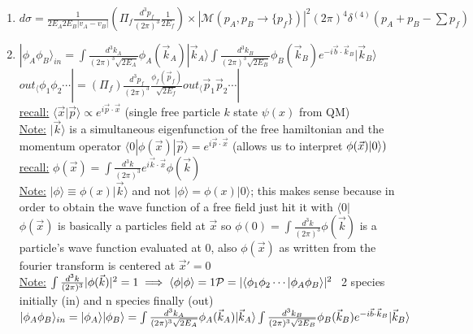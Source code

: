 \documentclass[12pt]{amsart}
\begin{document}
\begin{enumerate}
\item \underline{$d \sigma = \frac{1}{2 E_A 2 E_B | v_A - v_B|} ( \Pi_f \frac{d^3 p_f}{(2 \pi)^3} \frac{1}{2 E_f}) 
\times | \mathcal{M}( p_A, p_B \rightarrow \{ p_f \} )|^2 (2 \pi)^4 \delta^{(4)} (p_A + p_B - \sum p_f)$}\\
\item \underline{$| \phi_A \phi_B \rangle_{in} = \int \frac{d^3 k_A}{(2 \pi)^3 \sqrt{2 E_A}} \phi_A( \vec{k}_{A}) | \vec{k}_A \rangle \int \frac{d^3 k_B}{(2 \pi)^3 \sqrt{2 E_B}} \phi_B ( \vec{k}_B) e^{- i \vec{b} \cdot \vec{k}_B} | \vec{k}_B \rangle$}\\
\underline{$out_\langle \phi_1 \phi_2 \cdots | = ( \Pi_f) \frac{d^3 p_f}{(2 \pi)^3} \frac{\phi_f(\vec{p}_f)}{\sqrt{2 E_f}} out_\langle \vec{p}_1 \vec{p}_2 \cdots |$}\\
\underline{recall:} $\langle \vec{x} | \vec{p} \rangle \propto e^{i \vec{p} \cdot \vec{x}}$ (single free particle $k$ state $\psi(x)$ from QM)\\
\underline{Note:} $|\vec{k} \rangle$ is a simultaneous eigenfunction of the free hamiltonian and the momentum operator
$\langle 0 | \phi( \vec{x}) | \vec{p} \rangle = e^{i \vec{p} \cdot \vec{x}}$ (allows us to interpret $\phi(\vec{x}) | 0 \rangle)\\$
\underline{recall:} $\phi( \vec{x}) = \int \frac{d^3 k}{(2 \pi)^3} e^{i \vec{k} \cdot \vec{x}} \phi(\vec{k})$\\
\underline{Note:} $|\phi \rangle \equiv \phi(x) | \vec{k} \rangle$ and not $| \phi \rangle = \phi(x) | 0 \rangle$; this makes sense because in order to obtain the wave function of a free field just hit it with $\langle 0|$\\
$\phi(\vec{x})$ is basically a particles field at $\vec{x}$ so $\phi(0)= \int \frac{d^3k}{(2 \pi)^3} \phi(\vec{k})$ is a particle's wave function evaluated at 0, also $\phi(\vec{x})$ as written from the fourier transform is centered at $\vec{x}'=0$\\
\underline{Note:} $\int \frac{d^3k}{(2 \pi)^3} | \phi( \vec{k})|^2=1 \implies \langle \phi | \phi \rangle = 1\\
\mathcal{P} = | \langle \phi_1 \phi_2 \cdots | \phi_A \phi_B \rangle |^2 \,\,$ 2 species initially (in) and n species finally (out)\\
$| \phi_A \phi_B \rangle_{in} = | \phi_A \rangle | \phi_B \rangle = \int \frac{d^3 k_A}{(2 \pi)^3 \sqrt{2 E_A}} \phi_A( \vec{k}_{A}) | \vec{k}_A \rangle \int \frac{d^3 k_B}{(2 \pi)^3 \sqrt{2 E_B}} \phi_B ( \vec{k}_B) e^{- i \vec{b} \cdot \vec{k}_B} | \vec{k}_B \rangle\\$

\end{enumerate}
\end{document}

